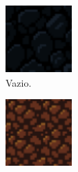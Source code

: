 \begin{figure}[H]
\centering
	\begin{subfigure}[b]{0.15\textwidth}
        \includegraphics[width=\textwidth]{fig/spelunky-empty.pdf}
		\caption{Vazio.}
	\end{subfigure}
	\begin{subfigure}[b]{0.15\textwidth}
        \includegraphics[width=\textwidth]{fig/spelunky-terrain.pdf}

\end{subfigure}
\end{figure}
